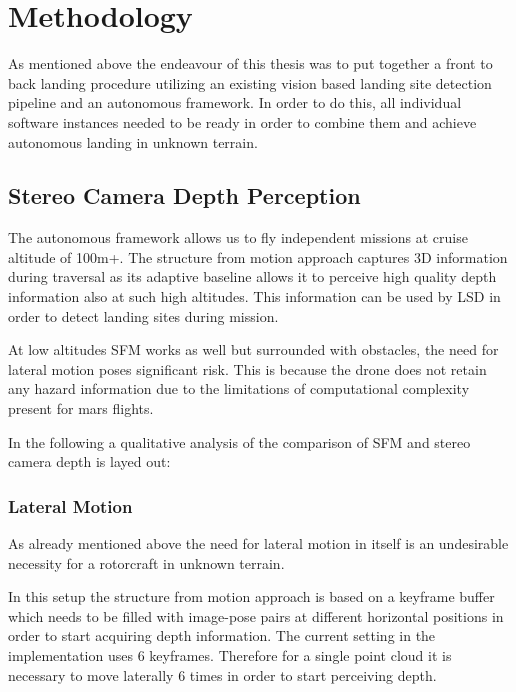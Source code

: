\chapter{Methodology}
\label{sec:methodology}

As mentioned above the endeavour of this thesis was to put together a front to back landing procedure utilizing an existing vision based landing site detection pipeline and an autonomous framework. In order to do this, all individual software instances needed to be ready in order to combine them and achieve autonomous landing in unknown terrain.

\section{Stereo Camera Depth Perception} \label{sec:StereoDepth}

The autonomous framework\citep{Autonomy} allows us to fly independent missions at cruise altitude of 100m+. The structure from motion approach captures 3D information during traversal as its adaptive baseline allows it to perceive high quality depth information also at such high altitudes. This information can be used by LSD in order to detect landing sites during mission. 

At low altitudes SFM works as well but surrounded with obstacles, the need for lateral motion poses significant risk. This is because the drone does not retain any hazard information due to the limitations of computational complexity present for mars flights. 

In the following a qualitative analysis of the comparison of SFM and stereo camera depth is layed out:

\subsection{Lateral Motion}

As already mentioned above the need for lateral motion in itself is an undesirable necessity for a rotorcraft in unknown terrain. 

In this setup the structure from motion approach is based on a keyframe buffer which needs to be filled with image-pose pairs at different horizontal positions in order to start acquiring depth information. The current setting in the implementation \citet{SFM} uses 6 keyframes. Therefore for a single point cloud it is necessary to move laterally 6 times in order to start perceiving depth. 

